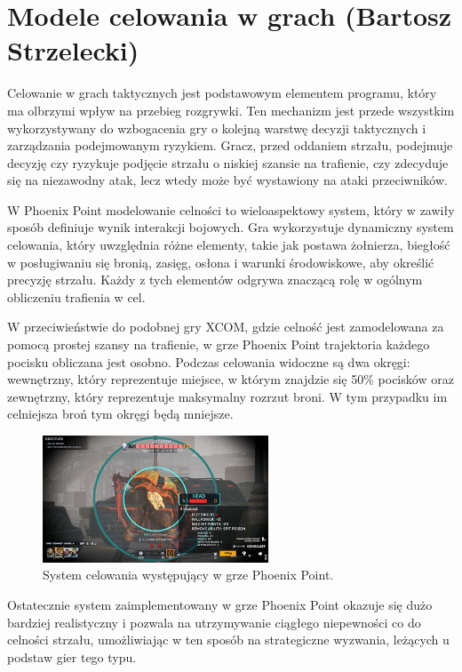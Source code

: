 \section{Modele celowania w grach (Bartosz Strzelecki)}
Celowanie w grach taktycznych jest podstawowym elementem programu, który ma
olbrzymi wpływ na przebieg rozgrywki. Ten mechanizm jest przede wszystkim wykorzystywany
do wzbogacenia gry o kolejną warstwę decyzji taktycznych i zarządzania podejmowanym ryzykiem.
Gracz, przed oddaniem strzału, podejmuje decyzję czy ryzykuje podjęcie strzału o niskiej szansie
na trafienie, czy zdecyduje się na niezawodny atak, lecz wtedy może być wystawiony na ataki przeciwników.

W Phoenix Point modelowanie celności to wieloaspektowy system, który w zawiły sposób definiuje wynik interakcji bojowych. 
Gra wykorzystuje dynamiczny system celowania, który uwzględnia różne elementy, takie jak postawa żołnierza, biegłość w posługiwaniu się bronią, zasięg, 
osłona i warunki środowiskowe, aby określić precyzję strzału. Każdy z tych elementów odgrywa znaczącą rolę w ogólnym obliczeniu trafienia w cel.

W przeciwieństwie do podobnej gry XCOM, gdzie celność jest zamodelowana za pomocą prostej szansy na trafienie, w grze Phoenix Point
trajektoria każdego pocisku obliczana jest osobno. Podczas celowania widoczne są dwa okręgi: wewnętrzny, który reprezentuje miejsce,
w którym znajdzie się 50\% pocisków oraz zewnętrzny, który reprezentuje maksymalny rozrzut broni. W tym przypadku im celniejsza broń tym
okręgi będą mniejsze.

\begin{figure}[h]
\centering
\includegraphics[width=0.6\textwidth]{images/point}
\caption{System celowania występujący w grze Phoenix Point.}
\label{fig:acc}
\end{figure}

Ostatecznie system zaimplementowany w grze Phoenix Point okazuje się dużo bardziej realistyczny i pozwala na utrzymywanie ciągłego niepewności
co do celności strzału, umożliwiając w ten sposób na strategiczne wyzwania, leżących u podstaw gier tego typu. 
